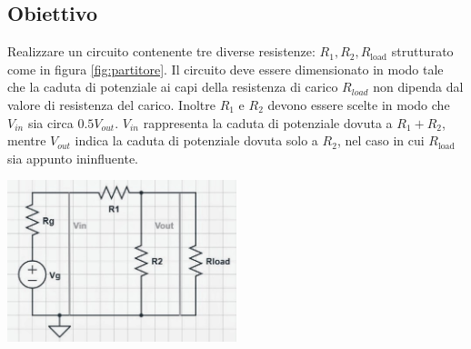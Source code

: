 \documentclass[a4paper]{article}
\begin{document}
\subsection{Obiettivo}
Realizzare un circuito contenente tre diverse resistenze: \emph{$R_1, R_2, R_{\text{load}}$} strutturato come in figura \ref{fig:partitore}.
Il circuito deve essere dimensionato in modo tale che la caduta di potenziale ai capi della resistenza di carico \( \mathit{R_{load}} \) non dipenda dal valore di resistenza del carico.
Inoltre \( \mathit{R_1} \) e \( \mathit{R_2} \) devono essere scelte in modo che \( \mathit{V_{\text{in}}} \) sia circa \( \mathit{0.5 V_{\text{out}}} \).
\( \mathit{V_{\text{in}}} \) rappresenta la caduta di potenziale dovuta a $R_1 + R_2$, mentre \( \mathit{V_{\text{out}}} \) indica la caduta di potenziale dovuta solo a $R_2$, nel caso in cui $R_{\text{load}}$ sia appunto ininfluente.
\begin{center}
	\includegraphics[width=0.5\textwidth]{grafici/partitore.jpg}
	\label{fig:partitore}
\end{center}
\end{document}

